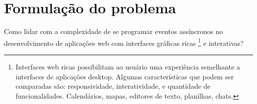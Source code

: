 \section{Formulação do problema}\label{lproblema}

Como lidar com a complexidade de se programar eventos assíncronos no
desenvolvimento de aplicações web com interfaces gráficas ricas
\footnote{Interfaces web ricas possibilitam ao usuário uma experiência
semelhante a interfaces de aplicações desktop. Algumas características que podem
ser comparadas são: responsividade, interatividade, e quantidade de
funcionalidades. Calendários, mapas, editores de texto, planilhas, chats.} e
interativas?

